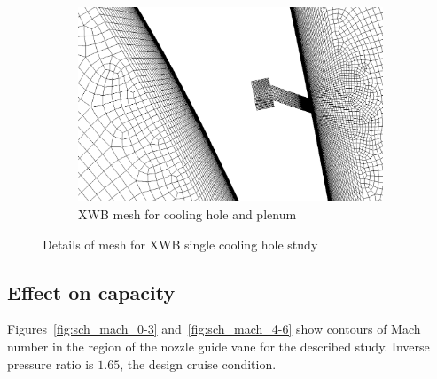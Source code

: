 \documentclass[a4paper, 11pt, oneside]{report}
\begin{document}
\begin{figure}[H]
  \begin{subfigure}{.45\textwidth}
    \centering
    \includegraphics[width=\linewidth]{figs/SCH_mesh_hole_placeholder.png}
    \caption{XWB mesh for cooling hole and plenum}
    \label{fig:SCH_mesh_3}
  \end{subfigure}
  \caption{Details of mesh for XWB single cooling hole study}
  \label{fig:SCH_mesh}
\end{figure}

\subsection{Effect on capacity}






Figures~\ref{fig:sch_mach_0-3} and~\ref{fig:sch_mach_4-6} show contours of Mach number in the region of the nozzle guide vane for the described study. Inverse pressure ratio is $1.65$, the design cruise condition.
\end{document}
